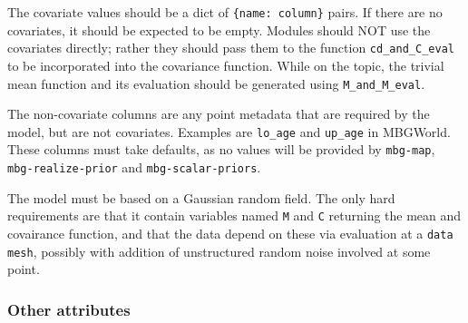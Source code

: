 The covariate values should be a dict of \texttt{{\{}name: column{\}}} pairs. If there are no covariates,
it should be expected to be empty. Modules should NOT use the covariates directly; rather
they should pass them to the function \texttt{cd{\_}and{\_}C{\_}eval} to be incorporated into the
covariance function. While on the topic, the trivial mean function and its evaluation
should be generated using \texttt{M{\_}and{\_}M{\_}eval}.

The non-covariate columns are any point metadata that are required by the model, but are
not covariates. Examples are \texttt{lo{\_}age} and \texttt{up{\_}age} in MBGWorld. These columns must
take defaults, as no values will be provided by \texttt{mbg-map}, \texttt{mbg-realize-prior} and
\texttt{mbg-scalar-priors}.

The model must be based on a Gaussian random field. The only hard requirements are that
it contain variables named \texttt{M} and \texttt{C} returning the mean and covairance function,
and that the data depend on these via evaluation at a \texttt{data mesh}, possibly with
addition of unstructured random noise involved at some point.





\subsubsection{Other attributes}
\label{sec:other-attributes}

